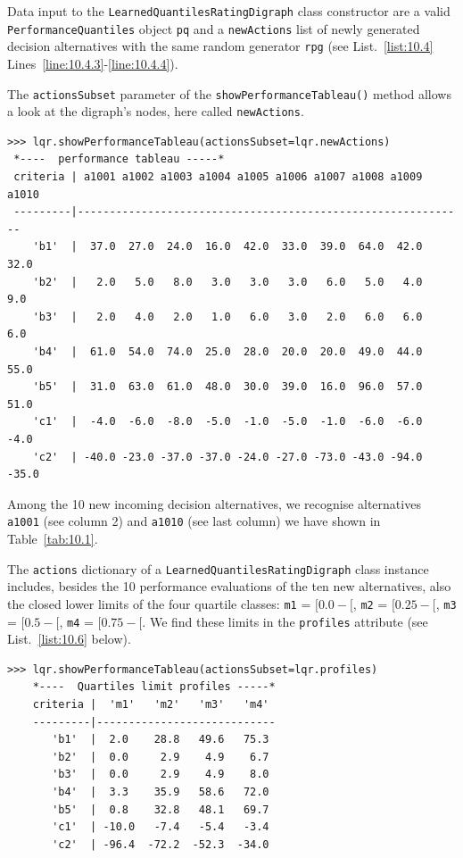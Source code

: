 Data input to the \texttt{LearnedQuantilesRatingDigraph} class constructor are a valid \texttt{PerformanceQuantiles} object \texttt{pq} and a \texttt{newActions} list of newly generated decision alternatives with the same random generator \texttt{rpg} (see List.~\vref{list:10.4} Lines~\ref{line:10.4.3}-\ref{line:10.4.4}).

The \texttt{actionsSubset} parameter of the \texttt{showPerformanceTableau()} method allows a look at the digraph's nodes, here called \texttt{newActions}.
\begin{lstlisting}[caption={Performance tableau of the new incoming decision alternatives},label=list:10.5,basicstyle=\ttfamily\scriptsize]
>>> lqr.showPerformanceTableau(actionsSubset=lqr.newActions)
 *----  performance tableau -----*
 criteria | a1001 a1002 a1003 a1004 a1005 a1006 a1007 a1008 a1009 a1010   
 ---------|-------------------------------------------------------------
    'b1'  |  37.0  27.0  24.0  16.0  42.0  33.0  39.0  64.0  42.0  32.0  
    'b2'  |   2.0   5.0   8.0   3.0   3.0   3.0   6.0   5.0   4.0   9.0  
    'b3'  |   2.0   4.0   2.0   1.0   6.0   3.0   2.0   6.0   6.0   6.0  
    'b4'  |  61.0  54.0  74.0  25.0  28.0  20.0  20.0  49.0  44.0  55.0  
    'b5'  |  31.0  63.0  61.0  48.0  30.0  39.0  16.0  96.0  57.0  51.0  
    'c1'  |  -4.0  -6.0  -8.0  -5.0  -1.0  -5.0  -1.0  -6.0  -6.0  -4.0  
    'c2'  | -40.0 -23.0 -37.0 -37.0 -24.0 -27.0 -73.0 -43.0 -94.0 -35.0  
\end{lstlisting}

Among the 10 new incoming decision alternatives, we recognise alternatives \texttt{a1001} (see column 2) and \texttt{a1010} (see last column) we have shown in Table~\vref{tab:10.1}.

The \texttt{actions} dictionary of a \texttt{LearnedQuantilesRatingDigraph} class instance includes, besides the 10 performance evaluations of the ten new alternatives, also the closed lower limits of the four quartile classes: \texttt{m1} = $[0.0- [$, \texttt{m2} = $[0.25- [$, \texttt{m3} = $[0.5- [$, \texttt{m4} = $[0.75 - [$. We find these limits in the \texttt{profiles} attribute (see List.~\vref{list:10.6} below).
\begin{lstlisting}[caption={Showing the limiting profiles of the rating quantiles},label=list:10.6]
>>> lqr.showPerformanceTableau(actionsSubset=lqr.profiles)
    *----  Quartiles limit profiles -----*
    criteria |  'm1'   'm2'   'm3'   'm4'   
    ---------|----------------------------
       'b1'  |  2.0    28.8   49.6   75.3  
       'b2'  |  0.0     2.9    4.9    6.7  
       'b3'  |  0.0     2.9    4.9    8.0  
       'b4'  |  3.3    35.9   58.6   72.0  
       'b5'  |  0.8    32.8   48.1   69.7  
       'c1'  | -10.0   -7.4   -5.4   -3.4  
       'c2'  | -96.4  -72.2  -52.3  -34.0  
\end{lstlisting}

